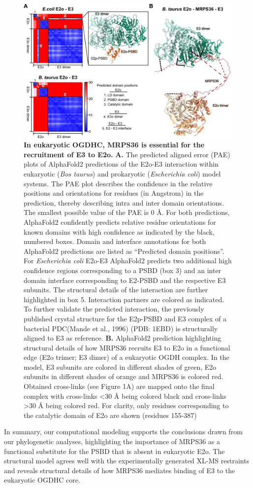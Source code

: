 \begin{figure}[t!]
	\centering
	\includegraphics[]{Chapter.5/Figures/Figure4.png}
	\caption{\textbf{In eukaryotic OGDHC, MRPS36 is essential for the recruitment of E3 to E2o.} \textbf{A.} The predicted aligned error (PAE) plots of AlphaFold2 predictions of the E2o-E3 interaction within eukaryotic (\emph{Bos taurus}) and prokaryotic (\emph{Escherichia coli}) model systems. The PAE plot describes the confidence in the relative positions and orientations for residues (in Angstrom) in the prediction, thereby describing intra and inter domain orientations. The smallest possible value of the PAE is 0 Å. For both predictions, AlphaFold2 confidently predicts relative residue orientations for known domains with high confidence as indicated by the black, numbered boxes. Domain and interface annotations for both AlphaFold2 predictions are listed as “Predicted domain positions”. For \emph{Escherichia coli} E2o-E3 AlphaFold2 predicts two additional high confidence regions corresponding to a PSBD (box 3) and an inter domain interface corresponding to E2-PSBD and the respective E3 subunits. The structural details of the interaction are further highlighted in box 5. Interaction partners are colored as indicated. To further validate the predicted interaction, the previously published crystal structure for the E2p-PSBD and E3 complex of a bacterial PDC(Mande et al., 1996) (PDB: 1EBD) is structurally aligned to E3 as reference. \textbf{B.} AlphaFold2 prediction highlighting structural details of how MRPS36 recruits E3 to E2o in a functional edge (E2o trimer; E3 dimer) of a eukaryotic OGDH complex. In the model, E3 subunits are colored in different shades of green, E2o subunits in different shades of orange and MRPS36 is colored red. Obtained cross-links (see Figure 1A) are mapped onto the final complex with cross-links <30 Å being colored black and cross-links >30 Å being colored red. For clarity, only residues corresponding to the catalytic domain of E2o are shown (residues 155-387)}
	\label{fig:ch5_fig4}
\end{figure}
In summary, our computational modeling supports the conclusions drawn from our phylogenetic analyses, highlighting the importance of MRPS36 as a functional substitute for the PSBD that is absent in eukaryotic E2o. The structural model agrees well with the experimentally generated XL-MS restraints and reveals structural details of how MRPS36 mediates binding of E3 to the eukaryotic OGDHC core.
%
